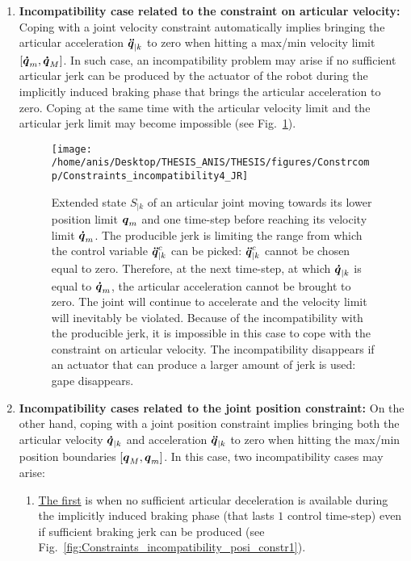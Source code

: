 \begin{enumerate}
\item \textbf{Incompatibility case related to the constraint on articular velocity:} 
Coping with a joint velocity constraint automatically implies bringing the articular acceleration $\mbox{\boldmath${\ddot{q}}$}_{|k}$ to zero when hitting a max/min velocity limit $[\mbox{\boldmath${\dot{q}}$}_{m}, \mbox{\boldmath${\dot{q}}$}_{M}]$. In such case, an incompatibility problem may arise if no sufficient articular jerk can be produced by the actuator of the robot during the implicitly induced braking phase that brings the articular acceleration to zero. Coping at the same time with the articular velocity limit and the articular jerk limit may become impossible (see Fig.~\ref{fig:Constraints_incompatibility_vel_constr_JR}).
\begin{figure*}
\centering
\texttt{[image: /home/anis/Desktop/THESIS\_ANIS/THESIS/figures/Constrcomp/Constraints\_incompatibility4\_JR]}
\caption{Extended state {\color{red} $S_{|k}$} of an articular joint moving towards its lower position limit $\mbox{\boldmath${q}$}_m$ and one time-step before reaching its velocity limit $\mbox{\boldmath${\dot{q}}$}_{m}$. The producible jerk is limiting the range from which the control variable $\mbox{\boldmath${\ddot{q}}$}_{|k}^{c}$ can be picked: $\mbox{\boldmath${\ddot{q}}$}_{|k}^{c}$ cannot be chosen equal to zero. Therefore, at the next time-step, at which $\mbox{\boldmath${\dot{q}}$}_{|k}$ is equal to $\mbox{\boldmath${\dot{q}}$}_{m}$, the articular acceleration cannot be brought to zero. The joint will continue to accelerate and the velocity limit will inevitably be violated. Because of the incompatibility with the producible jerk, it is impossible in this case to cope with the constraint on articular velocity. The incompatibility disappears if an actuator that can produce a larger amount of jerk is used: gape  disappears.}
\label{fig:Constraints_incompatibility_vel_constr_JR}
\end{figure*}
\item \textbf{Incompatibility cases related to the joint position constraint:}
On the other hand, coping with a joint position constraint implies bringing both the articular velocity $\mbox{\boldmath${\dot{q}}$}_{|k}$ and acceleration $\mbox{\boldmath${\ddot{q}}$}_{|k}$ to zero when hitting the max/min position boundaries $[\mbox{\boldmath${q}$}_{M}, \mbox{\boldmath${q}$}_{m}]$. In this case, two incompatibility cases may arise: 
\begin{enumerate}[label=\Alph*]
\item \underline{The first} is when no sufficient articular deceleration is available during the implicitly induced braking phase (that lasts $1$ control time-step) even if sufficient braking jerk can be produced (see Fig.~\ref{fig:Constraints_incompatibility_posi_constr1}). 

\end{enumerate}
\end{enumerate}
